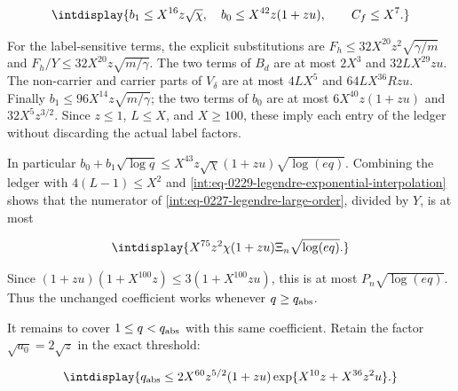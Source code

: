 \begingroup\renewcommand{\theHequation}{intdisplay.545}
\begin{equation}
\intdisplay{
b_1\le X^{16}z\sqrt\chi,\quad
b_0\le X^{42}z(1+zu),\qquad C_f\le X^7.
}
\label{int:eq-0230-legendre-simple-power-ledger}
\end{equation}
\endgroup


For the label-sensitive terms, the explicit substitutions are \(F_h\le32X^{20}z^2\sqrt{\gamma/m}\) and \(F_h/Y\le32X^{20}z\sqrt{m/\gamma}\). The two terms of \(B_d\) are at most \(2X^3\) and \(32LX^{29}zu\). The non-carrier and carrier parts of \(V_\delta\) are at most \(4LX^5\) and \(64LX^{36}Rzu\). Finally \(b_1\le96X^{14}z\sqrt{m/\gamma}\); the two terms of \(b_0\) are at most \(6X^{40}z(1+zu)\) and \(32X^5z^{3/2}\). Since \(z\le1\), \(L\le X\), and \(X\ge100\), these imply each entry of the ledger without discarding the actual label factors.



In particular \(b_0+b_1\sqrt{\log q} \le X^{43}z\sqrt\chi(1+zu)\sqrt{\log(eq)}\). Combining the ledger with \(4(L-1)\le X^2\) and \eqref{int:eq-0229-legendre-exponential-interpolation} shows that the numerator of \eqref{int:eq-0227-legendre-large-order}, divided by \(Y\), is at most


\begingroup\renewcommand{\theHequation}{intdisplay.546}
\begin{equation*}
\intdisplay{
X^{75}z^2\chi(1+zu)\Xi_n\sqrt{\log(eq)}.
}
\end{equation*}
\endgroup


Since \((1+zu)(1+X^{100}z)\le3(1+X^{100}zu)\), this is at most \(P_n\sqrt{\log(eq)}\). Thus the unchanged coefficient works whenever \(q\ge q_{\rm abs}\).



It remains to cover \(1\le q<q_{\rm abs}\) with this same coefficient. Retain the factor \(\sqrt{a_0}=2\sqrt z\) in the exact threshold:


\begingroup\renewcommand{\theHequation}{intdisplay.547}
\begin{equation*}
\intdisplay{
q_{\rm abs}\le2X^{60}z^{5/2}(1+zu)
\exp\{X^{10}z+X^{36}z^2u\}.
}
\end{equation*}
\endgroup

